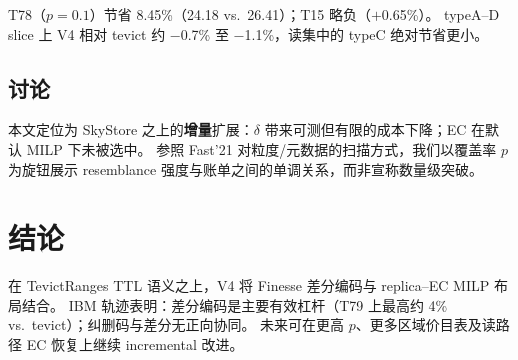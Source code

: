 \documentclass[conference]{IEEEtran}
\begin{document}
T78（$p{=}0.1$）节省 8.45\%（24.18 vs.\ 26.41）；T15 略负（$+$0.65\%）。
typeA--D slice 上 V4 相对 tevict 约 $-$0.7\% 至 $-$1.1\%，读集中的 typeC 绝对节省更小。

\subsection{讨论}

本文定位为 SkyStore 之上的\textbf{增量}扩展：$\delta$ 带来可测但有限的成本下降；EC 在默认 MILP 下未被选中。
参照 Fast'21 对粒度/元数据的扫描方式，我们以覆盖率 $p$ 为旋钮展示 resemblance 强度与账单之间的单调关系，而非宣称数量级突破。

\section{结论}
\label{sec:conclusion}

在 TevictRanges TTL 语义之上，V4 将 Finesse 差分编码与 replica--EC MILP 布局结合。
IBM 轨迹表明：差分编码是主要有效杠杆（T79 上最高约 4\% vs.\ tevict）；纠删码与差分无正向协同。
未来可在更高 $p$、更多区域价目表及读路径 EC 恢复上继续 incremental 改进。



\end{document}
